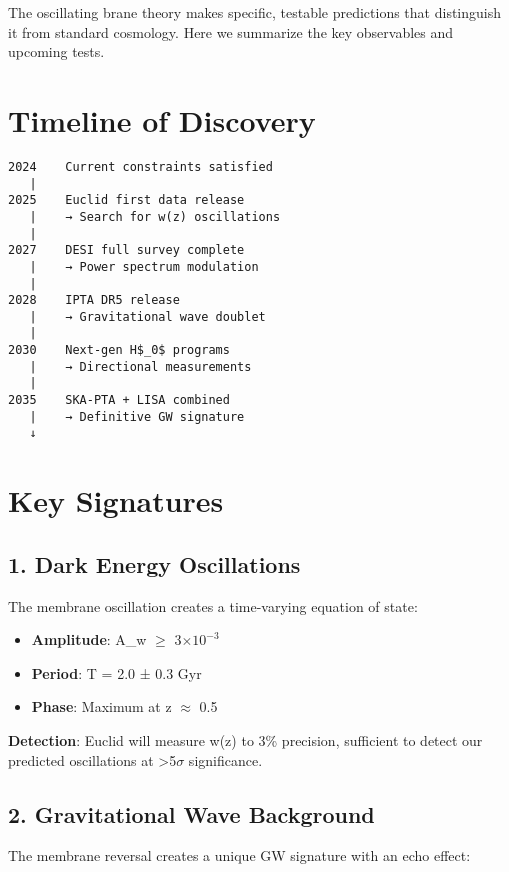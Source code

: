 \documentclass[
  11pt,
]{report}
\providecommand{\tightlist}{%
  \setlength{\itemsep}{0pt}\setlength{\parskip}{0pt}}
\begin{document}
The oscillating brane theory makes specific, testable predictions that
distinguish it from standard cosmology. Here we summarize the key
observables and upcoming tests.

\section{Timeline of Discovery}\label{timeline-of-discovery}

\begin{verbatim}
2024    Current constraints satisfied
   |
2025    Euclid first data release
   |    → Search for w(z) oscillations
   |
2027    DESI full survey complete
   |    → Power spectrum modulation
   |
2028    IPTA DR5 release
   |    → Gravitational wave doublet
   |
2030    Next-gen H$_0$ programs
   |    → Directional measurements
   |
2035    SKA-PTA + LISA combined
   |    → Definitive GW signature
   ↓
\end{verbatim}

\section{Key Signatures}\label{key-signatures}

\subsection{1. Dark Energy Oscillations}\label{dark-energy-oscillations}

The membrane oscillation creates a time-varying equation of state:

\begin{itemize}
\tightlist
\item
  \textbf{Amplitude}: A\_w \(\geq\) 3\(\times 10^{-3}\)
\item
  \textbf{Period}: T = 2.0 ± 0.3 Gyr
\item
  \textbf{Phase}: Maximum at z \(\approx\) 0.5
\end{itemize}

\textbf{Detection}: Euclid will measure w(z) to 3\% precision,
sufficient to detect our predicted oscillations at
\textgreater5\(\sigma\) significance.

\subsection{2. Gravitational Wave
Background}\label{gravitational-wave-background}

The membrane reversal creates a unique GW signature with an echo effect:
\end{document}
